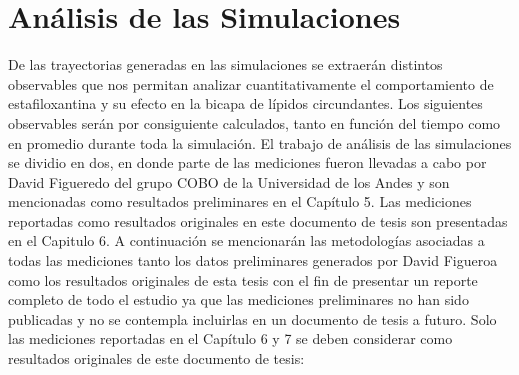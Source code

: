 \section{An\'{a}lisis de las Simulaciones}

De las trayectorias generadas en las simulaciones se extraer\'{a}n distintos observables que nos permitan analizar cuantitativamente el comportamiento de estafiloxantina y su efecto en la bicapa de l\'{i}pidos circundantes. Los siguientes observables ser\'{a}n por consiguiente calculados, tanto en funci\'{o}n del tiempo como en promedio durante toda la simulaci\'{o}n. El trabajo de an\'{a}lisis de las simulaciones se dividio en dos, en donde parte de las mediciones fueron llevadas a cabo por David Figueredo del grupo COBO de la Universidad de los Andes y son mencionadas como resultados preliminares en el Cap\'{i}tulo 5. Las mediciones reportadas como resultados originales en este documento de tesis son presentadas en el Capitulo 6. A continuaci\'{o}n se mencionar\'{a}n las metodolog\'{i}as asociadas a todas las mediciones tanto los datos preliminares generados por David Figueroa como los resultados originales de esta tesis con el fin de presentar un reporte completo de todo el estudio ya que las mediciones preliminares no han sido publicadas y no se contempla incluirlas en un documento de tesis a futuro. Solo las mediciones reportadas en el Cap\'{i}tulo 6 y 7 se deben considerar como resultados originales de este documento de tesis:\\
